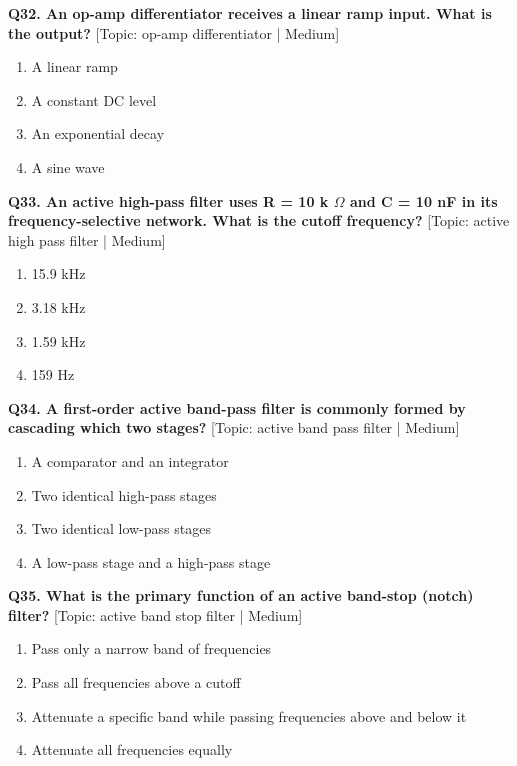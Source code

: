 \noindent\textbf{Q32. An op-amp differentiator receives a linear ramp input. What is the output?} \hfill [Topic: op-amp differentiator | Medium]
\begin{enumerate}[label=(\alph*),topsep=2pt,itemsep=1pt,partopsep=0pt,parsep=0pt]
    \item {A linear ramp}
    \item {A constant DC level}
    \item {An exponential decay}
    \item {A sine wave}
\end{enumerate}
\vspace{2mm}

\noindent\textbf{Q33. An active high-pass filter uses R = 10 k $\Omega$ and C = 10 nF in its frequency-selective network. What is the cutoff frequency?} \hfill [Topic: active high pass filter | Medium]
\begin{enumerate}[label=(\alph*),topsep=2pt,itemsep=1pt,partopsep=0pt,parsep=0pt]
    \item {15.9 kHz}
    \item {3.18 kHz}
    \item {1.59 kHz}
    \item {159 Hz}
\end{enumerate}
\vspace{2mm}

\noindent\textbf{Q34. A first-order active band-pass filter is commonly formed by cascading which two stages?} \hfill [Topic: active band pass filter | Medium]
\begin{enumerate}[label=(\alph*),topsep=2pt,itemsep=1pt,partopsep=0pt,parsep=0pt]
    \item {A comparator and an integrator}
    \item {Two identical high-pass stages}
    \item {Two identical low-pass stages}
    \item {A low-pass stage and a high-pass stage}
\end{enumerate}
\vspace{2mm}

\noindent\textbf{Q35. What is the primary function of an active band-stop (notch) filter?} \hfill [Topic: active band stop filter | Medium]
\begin{enumerate}[label=(\alph*),topsep=2pt,itemsep=1pt,partopsep=0pt,parsep=0pt]
    \item {Pass only a narrow band of frequencies}
    \item {Pass all frequencies above a cutoff}
    \item {Attenuate a specific band while passing frequencies above and below it}
    \item {Attenuate all frequencies equally}
\end{enumerate}
\vspace{2mm}

